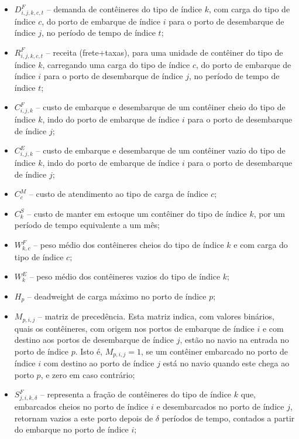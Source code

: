 \documentclass[preprint,10pt,5p]{elsarticle}
\begin{document}
\begin{itemize}
    \item \(D_{i,j,k,c,t}^{F}\) – demanda de contêineres do tipo de índice \(k\), com carga do tipo de índice \(c\), do porto de embarque de índice \(i\) para o porto de desembarque de índice \(j\), no período de tempo de índice \(t\);
    \item \(R_{i,j,k,c,t}^{F}\) – receita (frete+taxas), para uma unidade de contêiner do tipo de índice \(k\), carregando uma carga do tipo de índice \(c\), do porto de embarque de índice \(i\) para o porto de desembarque de índice \(j\), no período de tempo de índice \(t\);
    \item \(C_{i,j,k}^{F}\) – custo de embarque e desembarque de um contêiner cheio do tipo de índice \(k\), indo do porto de embarque de índice \(i\) para o porto de desembarque de índice \(j\);
    \item \(C_{i,j,k}^{E}\) – custo de embarque e desembarque de um contêiner vazio do tipo de índice \(k\), indo do porto de embarque de índice \(i\) para o porto de desembarque de índice \(j\);
    \item \(C_{c}^{M}\) – custo de atendimento ao tipo de carga de índice \(c\);
    \item \(C_{k}^{S}\) – custo de manter em estoque um contêiner do tipo de índice \(k\), por um período de tempo equivalente a um mês;
    \item \(W_{k,c}^{F}\) – peso médio dos contêineres cheios do tipo de índice \(k\) e com carga do tipo de índice \(c\);
    \item \(W_{k}^{E}\) – peso médio dos contêineres vazios do tipo de índice \(k\);
    \item \(H_{p}\) – deadweight de carga máximo no porto de índice \(p\);
    \item \(M_{p,i,j}\) – matriz de precedência. Esta matriz indica, com valores binários, quais os contêineres, com origem nos portos de embarque de índice \(i\) e com destino aos portos de desembarque de índice \(j\), estão no navio na entrada no porto de índice \(p\). Isto é, \(M_{p,i,j} = 1\), se um contêiner embarcado no porto de índice \(i\) com destino ao porto de índice \(j\) está no navio quando este chega ao porto \(p\), e zero em caso contrário;
    \item \(S_{j,i,k,\delta}^{F}\) – representa a fração de contêineres do tipo de índice \(k\) que, embarcados cheios no porto de índice \(i\) e desembarcados no porto de índice \(j\), retornam vazios a este porto depois de \(\delta\) períodos de tempo, contados a partir do embarque no porto de índice \(i\);

\end{itemize}
\end{document}
